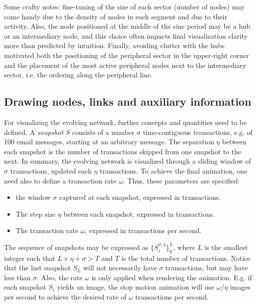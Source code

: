 \documentclass[runningheads]{llncs}
\begin{document}
\noindent Some crafty notes: fine-tuning of the size of each sector (number of nodes) may come handy due to the density of nodes in each segment and due to their activity. Also, the node positioned at the middle of the sine period may be a hub or an intermediary node, and this choice often impacts final visualization clarity more than predicted by intuition.
Finally, 
avoiding clutter with the hubs motivated both 
the positioning of the peripheral sector in the upper-right corner and
the placement of the most active peripheral nodes next to the intermediary sector, i.e. the ordering along the peripheral line.

\subsection{Drawing nodes, links and auxiliary information}
For visualizing the evolving network, further concepts and quantities need to be defined.
A \emph{snapshot} $S$ consists of a number $\sigma$ time-contiguous transactions, e.g. of 100 email messages, starting at an arbitrary message.
The separation $\eta$ between each snapshot is the number of transactions skipped from one snapshot to the next.
In summary, the evolving network is visualized through a sliding window of $\sigma$ transactions, updated each $\eta$ transactions. To achieve the final animation, one need also to define a transaction rate $\omega$.
Thus, these parameters are specified:
\begin{itemize}
  \item the window $\sigma$ captured at each snapshot, expressed in transactions.
  \item The step size $\eta$ between each snapshot, expressed in transactions.
  \item The transaction rate $\omega$, expressed in transactions per second.
\end{itemize}

\noindent The sequence of snapshots may be expressed as $\{S_i^{\sigma, \eta}\}_0^{L}$, where $L$ is the smallest integer such that $L\times \eta + \sigma > T$ and $T$ is the total number of transactions. Notice that the last snapshot $S_L$ will not necessarily have $\sigma$ transactions, but may have less than $\sigma$. Also, the rate $\omega$ is only applied when rendering the animation. E.g. if each snapshot $S_i$ yields an image, the stop motion animation will use $\omega/\eta$ images per second to achieve the desired rate of $\omega$ transactions per second.
\end{document}
